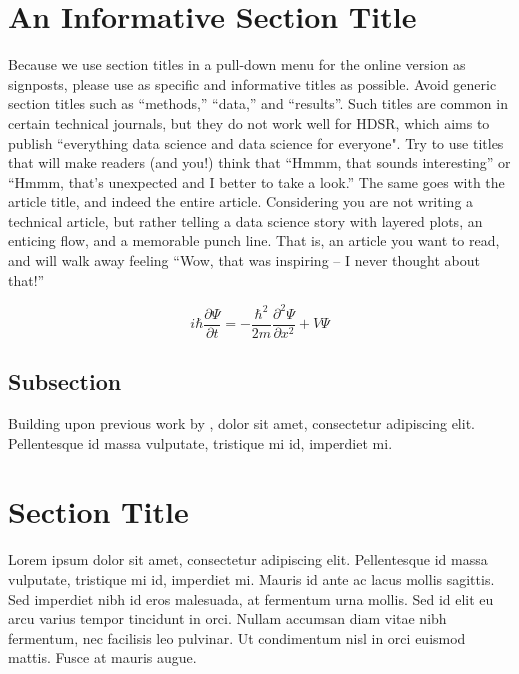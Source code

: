 \documentclass[]{hdsr}
\begin{document}
\section{An Informative Section Title}
\label{sec1}
Because we use section titles in a pull-down menu for the online version as signposts, please use as specific and informative titles as possible. Avoid generic section titles such as ``methods,'' ``data,'' and ``results''. Such titles are common in certain technical journals, but they do not work well for HDSR, which aims to publish ``everything data science and data science for everyone". Try to use titles that will make readers (and you!) think that ``Hmmm, that sounds interesting'' or ``Hmmm, that's unexpected and I better to take a look.''   The same goes with the article title, and indeed the entire article.  Considering you are not writing a technical article, but rather telling a data science story with layered plots, an enticing flow, and a memorable punch line. That is, an article you want to read, and will walk away feeling ``Wow, that was inspiring -- I never thought about that!'' 

\begin{equation}
    i\hbar \frac{\partial \Psi}{\partial t} = -\frac{\hbar^2}{2m}
\frac{\partial^2 \Psi}{\partial x^2} + V \Psi
\end{equation}


\subsection{Subsection}

Building upon previous work by \citet{2020.03.27.20043752},  dolor sit amet, consectetur adipiscing elit. Pellentesque id massa vulputate, tristique mi id, imperdiet mi.

\section{Section Title}
Lorem ipsum dolor sit amet, consectetur adipiscing elit. Pellentesque id massa vulputate, tristique mi id, imperdiet mi. Mauris id ante ac lacus mollis sagittis. Sed imperdiet nibh id eros malesuada, at fermentum urna mollis. Sed id elit eu arcu varius tempor tincidunt in orci. Nullam accumsan diam vitae nibh fermentum, nec facilisis leo pulvinar. Ut condimentum nisl in orci euismod mattis. Fusce at mauris augue. 


\restoregeometry
{}
\end{document}
